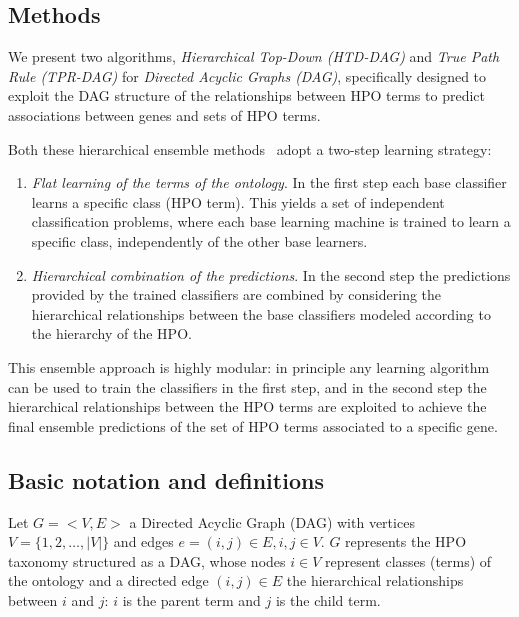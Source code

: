 \documentclass{bioinfo}
\begin{document}
\begin{methods}

\section{Methods}
\label{hiermeth}

We present two algorithms, {\em Hierarchical Top-Down (HTD-DAG)} and {\em True Path Rule (TPR-DAG)} for {\em Directed Acyclic Graphs (DAG)}, specifically designed to exploit the DAG structure of the relationships between HPO terms to predict associations between genes and sets of HPO terms.

Both these hierarchical ensemble methods~\citep{Silla11} adopt a two-step learning strategy:
\begin{enumerate}
\item {\em Flat learning of the terms of the ontology}. In the first step each base classifier learns a specific class (HPO term). This yields a set of independent classification problems, where each base learning machine is trained to learn a specific class, independently of the other base learners.
\item {\em Hierarchical combination of the predictions}. In the second step the predictions provided by the trained classifiers are combined by considering the hierarchical relationships between the base classifiers modeled according to the hierarchy of the HPO.
\end{enumerate}
This ensemble approach is highly modular: in principle any learning algorithm can be used to train the classifiers in the first step, and in the second step the hierarchical relationships between the HPO terms are exploited to achieve the final ensemble predictions of the set of HPO terms associated to a specific gene.


\subsection{Basic notation and definitions}
Let $G = <V,E>$ a Directed Acyclic Graph (DAG) with vertices $V = \{1, 2, \ldots, |V| \}$ and edges $e=(i,j) \in E, i,j \in V$. $G$ represents the HPO taxonomy structured as a DAG, whose nodes $i \in V$ represent classes (terms) of the ontology and a directed edge $(i,j) \in E$ the hierarchical relationships between $i$ and $j$: $i$ is the parent term and $j$ is the child term. 


\end{methods}
\end{document}

